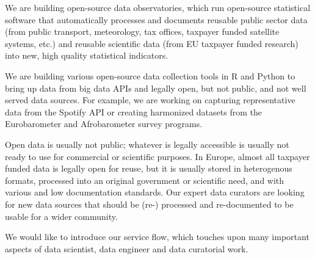 \documentclass[
  a4paper,
  openany, a4paper, oneside]{book}
\begin{document}
We are building open-source data observatories, which run open-source statistical software that automatically processes and documents reusable public sector data (from public transport, meteorology, tax offices, taxpayer funded satellite systems, etc.) and reusable scientific data (from EU taxpayer funded research) into new, high quality statistical indicators.

We are building various open-source data collection tools in R and Python to bring up data from big data APIs and legally open, but not public, and not well served data sources. For example, we are working on capturing representative data from the Spotify API or creating harmonized datasets from the Eurobarometer and Afrobarometer survey programs.

Open data is usually not public; whatever is legally accessible is usually not ready to use for commercial or scientific purposes. In Europe, almost all taxpayer funded data is legally open for reuse, but it is usually stored in heterogenous formats, processed into an original government or scientific need, and with various and low documentation standards. Our expert data curators are looking for new data sources that should be (re-) processed and re-documented to be usable for a wider community.

We would like to introduce our service flow, which touches upon many important aspects of data scientist, data engineer and data curatorial work.
\end{document}

